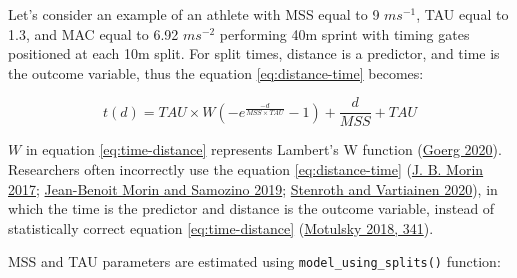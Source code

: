 \documentclass[fleqn,10pt]{wlpeerj} %
\begin{document}
Let's consider an example of an athlete with MSS equal to 9 \(ms^{-1}\), TAU equal to 1.3, and MAC equal to 6.92 \(ms^{-2}\) performing 40m sprint with timing gates positioned at each 10m split. For split times, distance is a predictor, and time is the outcome variable, thus the equation \eqref{eq:distance-time} becomes:

\begin{equation}
  t(d) = TAU \times W(-e^{\frac{-d}{MSS \times TAU}} - 1) + \frac{d}{MSS} + TAU \label{eq:time-distance}
\end{equation}

\(W\) in equation \eqref{eq:time-distance} represents Lambert's W function (\protect\hyperlink{ref-R-LambertW}{Goerg 2020}). Researchers often incorrectly use the equation \eqref{eq:distance-time} (\protect\hyperlink{ref-morinSpreadsheetSprintAcceleration2017}{J. B. Morin 2017}; \protect\hyperlink{ref-morinSpreadsheetSprintAcceleration2019}{Jean-Benoit Morin and Samozino 2019}; \protect\hyperlink{ref-stenrothSpreadsheetSprintAcceleration2020}{Stenroth and Vartiainen 2020}), in which the time is the predictor and distance is the outcome variable, instead of statistically correct equation \eqref{eq:time-distance} (\protect\hyperlink{ref-motulskyIntuitiveBiostatisticsNonmathematical2018}{Motulsky 2018, 341}).

MSS and TAU parameters are estimated using \texttt{model\_using\_splits()} function:

\small
\end{document}
